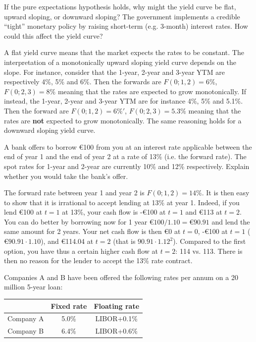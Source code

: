 \documentclass[12pt,a4paper]{exam}
\begin{document}
\begin{questions}
\question If the pure expectations hypothesis holds, why might the yield curve be flat, upward sloping, or downward sloping? The government implements a credible “tight” monetary policy by raising short-term (e.g. 3-month) interest rates. How could this affect the yield curve?
\begin{solution}
A flat yield curve means that the market expects the rates to be constant.
The interpretation of a monotonically upward sloping yield curve depends on the slope. For instance, consider that the 1-year, 2-year and 3-year YTM are respectively 4\%, 5\% and 6\%. Then the forwards are $F(0;1,2)=6\%$, $F(0;2,3)=8\%$ meaning that the rates are expected to grow monotonically. If instead, the 1-year, 2-year and 3-year YTM are for instance  4\%, 5\% and 5.1\%. Then the forward are $F(0;1,2)=6\%'$, $F(0;2,3)=5.3\%$ meaning that the rates are \textbf{not} expected to grow monotonically. 
The same reasoning holds for a downward sloping yield curve.
\end{solution}
\question A bank offers to borrow €100 from you at an interest rate applicable between the end of year 1 and the end of year 2 at a rate of 13\% (i.e. the forward rate). The spot rates for 1-year and 2-year are currently 10\% and 12\% respectively. Explain whether you would take the bank’s offer. 
\begin{solution}
The forward rate between year 1 and year 2 is $F(0;1,2)=14\%$. It is then easy to show that it is irrational to accept lending at 13\% at year 1. Indeed, if you lend €100 at $t=1$ at 13\%, your cash flow is -€100 at $t=1$ and €113 at $t=2$. 
You can do better by borrowing now for 1 year $€100/1.10=€90.91$ and lend the same amount for 2 years. Your net cash flow is then €0 at $t=0$, -€100 at $t=1$ ($€90.91\cdot 1.10$), and €114.04 at $t=2$ (that is $90.91\cdot 1.12^2$). 
Compared to the first option, you have thus a certain higher cash flow at $t=2$: 114 vs. 113.  There is then no reason for the lender to accept the 13\% rate contract. 
\end{solution}

\question Companies A and B have been offered the following rates per annum on a 20 million 5-year loan:
\begin{center}
\begin{tabular}{|c|c|c|}
\hline
& Fixed rate & Floating rate \\ \hline
Company A &  5.0\% & LIBOR+0.1\% \\ \hline
Company B & 6.4\% & LIBOR+0.6\%  \\ \hline
\end{tabular}
\end{center}


\end{questions}
\end{document}
